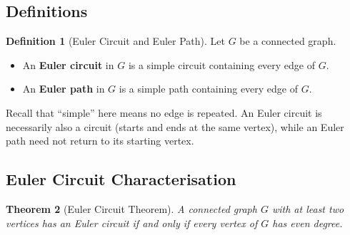 \documentclass[11pt, a4paper, notitlepage]{report}
\newtheorem{theorem}{Theorem}[section]
\theoremstyle{definition}
\newtheorem{definition}[theorem]{Definition}
\theoremstyle{remark}
\begin{document}
\subsection{Definitions}
\label{subsec:euler-def}

\begin{definition}[Euler Circuit and Euler Path]
\label{def:euler}
Let $G$ be a connected graph.
\begin{itemize}
  \item An \textbf{Euler circuit} in $G$ is a simple circuit containing every edge of $G$.
  \item An \textbf{Euler path} in $G$ is a simple path containing every edge of $G$.
\end{itemize}
\end{definition}

Recall that ``simple'' here means no edge is repeated. An Euler circuit is necessarily also a
circuit (starts and ends at the same vertex), while an Euler path need not return to its
starting vertex.

\subsection{Euler Circuit Characterisation}
\label{subsec:euler-circuit}

\begin{theorem}[Euler Circuit Theorem]
\label{thm:euler-circuit}
A connected graph $G$ with at least two vertices has an Euler circuit if and only if every
vertex of $G$ has even degree.
\end{theorem}
\end{document}
